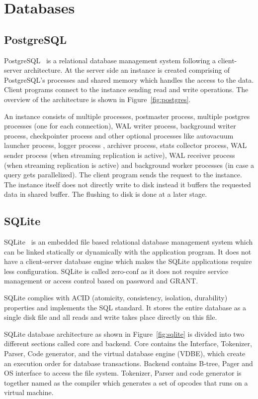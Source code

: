 \section{Databases}
\label{sec:db}

\subsection{PostgreSQL}

PostgreSQL~\cite{ref:pg1} is a relational database management system following a client-server architecture. At the server side an instance is created comprising of PostgreSQL's processes and shared memory which handles the access to the data. Client programs connect to the instance sending read and write operations. The overview of the architecture is shown in Figure~\ref{fig:postgres}.

An instance consists of multiple processes,  postmaster process, multiple postgres processes (one for each connection), WAL writer process, background writer process, checkpointer process and other optional processes like autovacuum launcher process, logger process , archiver process, stats collector process, WAL sender process (when streaming replication is active), WAL receiver process (when streaming replication is active) and background worker processes (in case a query gets parallelized). The client program sends the request to the instance. The instance itself does not directly write to disk instead it buffers the requested data in shared buffer. The flushing to disk is done at a later stage.

\subsection{SQLite}


SQLite~\cite{ref:sqlite2} is an embedded file based relational database management system which can be linked statically or dynamically with the application program. It does not have a client-server database engine which makes the SQLite applications require less configuration. SQLite is called zero-conf as it does not require service management or access control based on password and GRANT.


SQLite complies with ACID  (atomicity, consistency, isolation, durability) properties and implements the SQL standard. It stores the entire database as a single disk file and all reads and write takes place directly on this file. 

SQLite database architecture as shown in Figure~\ref{fig:sqlite} is divided into two different sections called core and backend. Core contains the Interface, Tokenizer, Parser, Code generator, and the virtual database engine (VDBE), which create an execution order for database transactions. Backend contains B-tree, Pager and OS interface to access the file system. Tokenizer, Parser and code generator is together named as the compiler which generates a set of opcodes that runs on a virtual machine.
